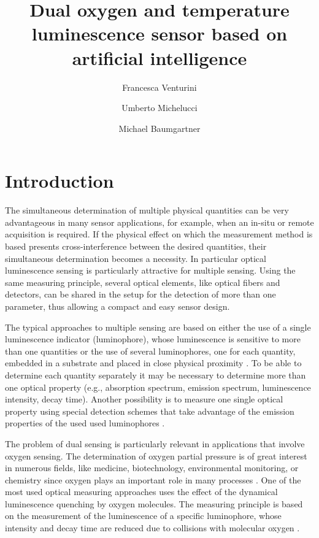 \documentclass[9pt,twocolumn,twoside,pdftex]{optica}
\title{Dual oxygen and temperature luminescence sensor based on artificial intelligence}
\author[1,2,*]{Francesca Venturini}
\author[2]{Umberto Michelucci}
\author[1]{Michael Baumgartner}
\affil[1]{Institute of Applied Mathematics and Physics, Zurich University of Applied Sciences,
Technikumstrasse 9, 8401 Winterthur, Switzerland}
\affil[2]{TOELT LLC; Birchlenstr. 25, 8600 Dübendorf, Switzerland}
\affil[*]{Corresponding author: francesca.venturini@zhaw.ch}
\begin{document}
\maketitle

\section{Introduction}

The simultaneous determination of multiple physical quantities can be very advantageous in many sensor applications, for example, when an in-situ or remote acquisition is required. 
If the physical effect on which the measurement method is based presents cross-interference between the desired quantities, their simultaneous determination becomes a necessity.
In particular optical luminescence sensing is particularly attractive for multiple sensing. Using the same measuring principle, several optical elements, like optical fibers and detectors, can be shared in the setup for the detection of more than one parameter, thus allowing a compact and easy sensor design.

The typical approaches to multiple sensing are based on either the use of a single luminescence indicator (luminophore), whose luminescence is sensitive to more than one quantities or the use of several luminophores, one for each quantity, embedded in a substrate and placed in close physical proximity \cite{Stich2010,Borisov2011novel,Kameya2014,Wang2014,Santoro2016,Biring2019}. To be able to determine each quantity separately it may be necessary to determine more than one optical property (e.g., absorption spectrum, emission spectrum, luminescence intensity, decay time). Another possibility is to measure one single optical property using special detection schemes that take advantage of the emission properties of the used used luminophores \cite{Collier2013,Wang2014,Stehning2004,Jorge2008,Biring2019,Moore2006}. 

The problem of dual sensing is particularly relevant in applications that involve oxygen sensing. The determination of oxygen partial pressure is of great interest in numerous fields, like medicine, biotechnology, environmental monitoring, or chemistry since oxygen plays an important role in many processes \cite{Papkovsky2013,Wang2014}. One of the most used optical measuring approaches uses the effect of the dynamical luminescence quenching by oxygen molecules. The measuring principle is based on the measurement of the luminescence of a specific luminophore, whose intensity and decay time are reduced due to collisions with molecular oxygen \cite{Lakowicz2006}.
\end{document}
